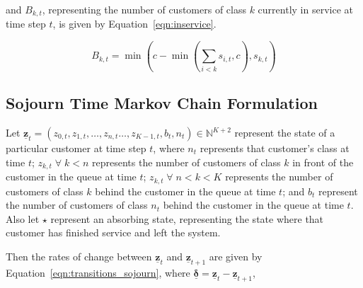 \documentclass{article}
\begin{document}
and $B_{k,t}$, representing the number of customers of class $k$ currently in
service at time step $t$, is given by Equation~\ref{eqn:inservice}.

\begin{equation}\label{eqn:inservice}
B_{k,t} =\min\left(c - \min\left(\sum_{i < k} s_{i,t}, c\right), s_{k,t}\right)
\end{equation}


\subsection{Sojourn Time Markov Chain Formulation}\label{sec:sojourn_formulation}
Let $\underline{\mathbf{z}}_t = (z_{0,t}, z_{1,t}, \dots, z_{n,t} \dots, z_{K-1,t}, b_t, n_t) \in \mathbb{N}^{K+2}$
represent the state of a particular customer at time step $t$, where $n_t$
represents that customer's class at time $t$; $z_{k,t} \; \forall \; k < n$
represents the number of customers of class $k$ in front of the customer in the
queue at time $t$; $z_{k,t} \; \forall \; n < k < K$ represents the number of
customers of class $k$ behind the customer in the queue at time $t$; and $b_t$
represent the number of customers of class $n_t$ behind the customer in the
queue at time $t$.
Also let $\star$ represent an absorbing state, representing the state where that
customer has finished service and left the system.

Then the rates of change between $\underline{\mathbf{z}}_t$ and
$\underline{\mathbf{z}}_{t+1}$ are given by Equation~\ref{eqn:transitions_sojourn},
where $\underline{\mathbf{\delta}} = \underline{\mathbf{z}}_t - \underline{\mathbf{z}}_{t+1}$,
\end{document}
